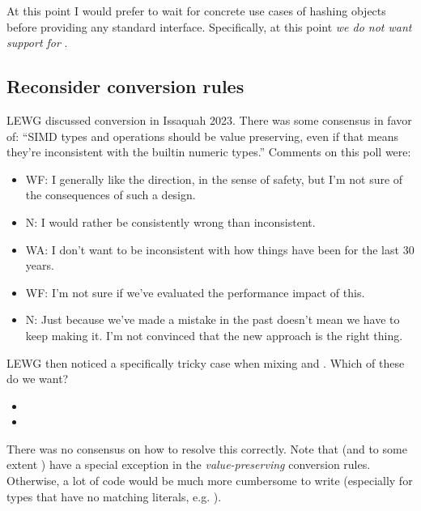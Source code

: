 At this point I would prefer to wait for concrete use cases of hashing \simd
objects before providing any standard interface.
Specifically, at this point \emph{we do not want \std{} support for
\simd}.

\subsection{Reconsider conversion rules}\label{sec:reconsider_conversions}

LEWG discussed conversion in Issaquah 2023.
There was some consensus in favor of: ``SIMD types and operations should be
value preserving, even if that means they're inconsistent with the builtin
numeric types.''
Comments on this poll were:
\begin{itemize}
  \item WF: I generally like the direction, in the sense of safety, but I'm
    not sure of the consequences of such a design.

  \item N: I would rather be consistently wrong than inconsistent.

  \item WA: I don't want to be inconsistent with how things have been for the last 30 years.

  \item WF: I'm not sure if we've evaluated the performance impact of this.

  \item N: Just because we've made a mistake in the past doesn't mean we have to keep making it. I'm not convinced that the new approach is the right thing.
\end{itemize}

LEWG then noticed a specifically tricky case when mixing  and .
Which of these do we want?
\begin{itemize}
  \item {}
  \item {}
\end{itemize}

There was no consensus on how to resolve this correctly.
Note that  (and to some extent ) have a special
exception in the \emph{value-preserving} conversion rules.
Otherwise, a lot of code would be much more cumbersome to write (especially for
types that have no matching literals, e.g. ).

